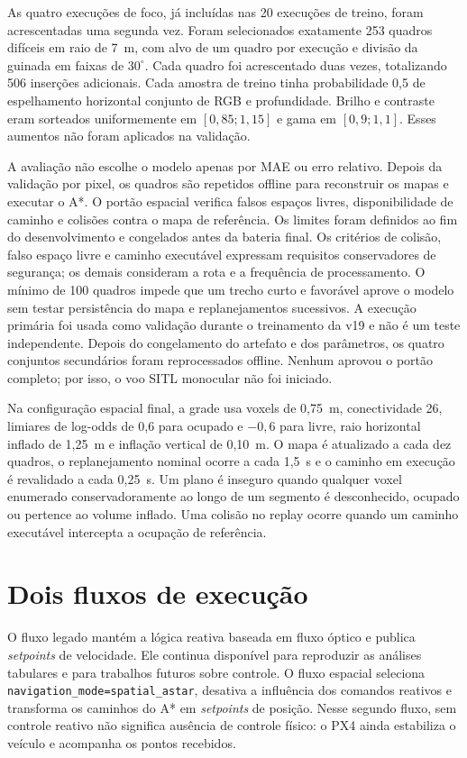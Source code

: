 As quatro execuções de foco, já incluídas nas 20 execuções de treino, foram acrescentadas uma segunda vez. Foram selecionados exatamente 253 quadros difíceis em raio de 7~m, com alvo de um quadro por execução e divisão da guinada em faixas de $30^\circ$. Cada quadro foi acrescentado duas vezes, totalizando 506 inserções adicionais. Cada amostra de treino tinha probabilidade 0,5 de espelhamento horizontal conjunto de RGB e profundidade. Brilho e contraste eram sorteados uniformemente em $[0{,}85;1{,}15]$ e gama em $[0{,}9;1{,}1]$. Esses aumentos não foram aplicados na validação.

A avaliação não escolhe o modelo apenas por MAE ou erro relativo. Depois da validação por pixel, os quadros são repetidos offline para reconstruir os mapas e executar o A*. O portão espacial verifica falsos espaços livres, disponibilidade de caminho e colisões contra o mapa de referência. Os limites foram definidos ao fim do desenvolvimento e congelados antes da bateria final. Os critérios de colisão, falso espaço livre e caminho executável expressam requisitos conservadores de segurança; os demais consideram a rota e a frequência de processamento. O mínimo de 100 quadros impede que um trecho curto e favorável aprove o modelo sem testar persistência do mapa e replanejamentos sucessivos. A execução primária foi usada como validação durante o treinamento da v19 e não é um teste independente. Depois do congelamento do artefato e dos parâmetros, os quatro conjuntos secundários foram reprocessados offline. Nenhum aprovou o portão completo; por isso, o voo SITL monocular não foi iniciado.

Na configuração espacial final, a grade usa voxels de 0,75~m, conectividade 26, limiares de log-odds de 0,6 para ocupado e $-0,6$ para livre, raio horizontal inflado de 1,25~m e inflação vertical de 0,10~m. O mapa é atualizado a cada dez quadros, o replanejamento nominal ocorre a cada 1,5~s e o caminho em execução é revalidado a cada 0,25~s. Um plano é inseguro quando qualquer voxel enumerado conservadoramente ao longo de um segmento é desconhecido, ocupado ou pertence ao volume inflado. Uma colisão no replay ocorre quando um caminho executável intercepta a ocupação de referência.

\section{Dois fluxos de execução}

O fluxo legado mantém a lógica reativa baseada em fluxo óptico e publica \textit{setpoints} de velocidade. Ele continua disponível para reproduzir as análises tabulares e para trabalhos futuros sobre controle. O fluxo espacial seleciona \texttt{navigation\_mode=spatial\_astar}, desativa a influência dos comandos reativos e transforma os caminhos do A* em \textit{setpoints} de posição. Nesse segundo fluxo, sem controle reativo não significa ausência de controle físico: o PX4 ainda estabiliza o veículo e acompanha os pontos recebidos.

